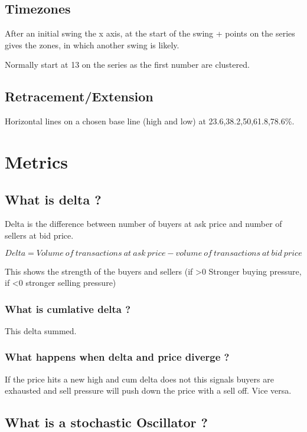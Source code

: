 \documentclass[11pt]{scrartcl} %
\begin{document}
\subsection{Timezones}

After an initial swing the x axis, at the start of the swing + points on the series gives the zones,
in which another swing is likely.

Normally start at 13 on the series as the first number are clustered.

\subsection{Retracement/Extension}

Horizontal lines on a chosen base line (high and low) at 23.6,38.2,50,61.8,78.6\%.

\section{Metrics}

\subsection{What is delta ?}

Delta is the difference between number of buyers at ask price and number of sellers at bid price.

\[ Delta = Volume\:of\:transactions\:at\:ask\:price - volume\:of\:transactions\:at\:bid\:price \]

This shows the strength of the buyers and sellers (if >0 Stronger buying pressure, if <0 stronger 
selling pressure)

\subsubsection{What is cumlative delta ?}

This delta summed.

\subsubsection{What happens when delta and price diverge ?}

If the price hits a new high and cum delta does not this signals buyers are exhausted and sell pressure will
push down the price with a sell off. Vice versa.

\subsection{What is a stochastic Oscillator ?}
\end{document}
